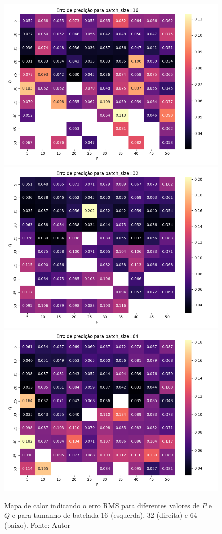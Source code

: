 \begin{figure}[hbt!]
    \centering
    \includegraphics[width=0.7\linewidth]{Imagens/chap04/simulation_hp_metrics_16.png}
    \hfill
    \includegraphics[width=0.7\linewidth]{Imagens/chap04/simulation_hp_metrics_32.png}
    \hfill
    \includegraphics[width=0.7\linewidth]{Imagens/chap04/simulation_hp_metrics_64.png}
    \caption{Mapa de calor indicando o erro RMS para diferentes valores de $P$ e $Q$ e para tamanho de batelada 16 (esquerda), 32 (direita) e 64 (baixo). Fonte: Autor}
    \label{fig:sim_hp_metrics}
\end{figure}

